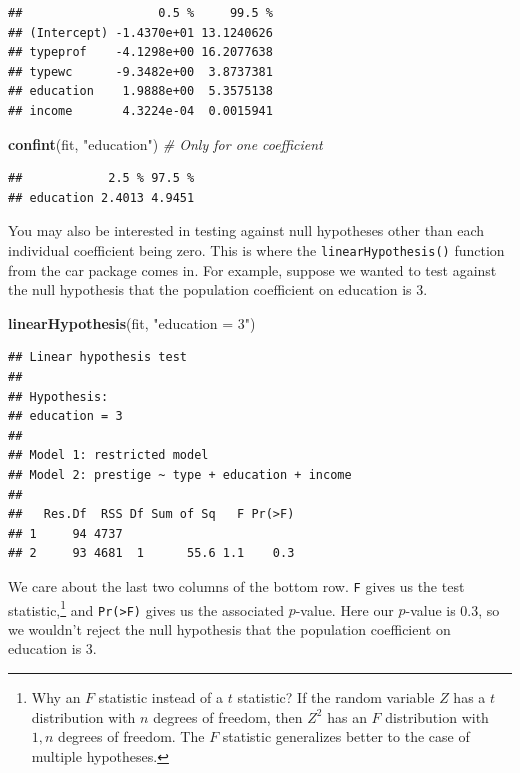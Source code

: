 \documentclass[12pt,oneside,openany]{book}
\newenvironment{Shaded}{\begin{snugshade}}{\end{snugshade}}
\newcommand{\KeywordTok}[1]{\textcolor[rgb]{0.13,0.29,0.53}{\textbf{#1}}}
\newcommand{\StringTok}[1]{\textcolor[rgb]{0.31,0.60,0.02}{#1}}
\newcommand{\CommentTok}[1]{\textcolor[rgb]{0.56,0.35,0.01}{\textit{#1}}}
\newcommand{\NormalTok}[1]{#1}
\let\rmarkdownfootnote\footnote%
\def\footnote{\protect\rmarkdownfootnote}
\begin{document}
\begin{verbatim}
##                   0.5 %     99.5 %
## (Intercept) -1.4370e+01 13.1240626
## typeprof    -4.1298e+00 16.2077638
## typewc      -9.3482e+00  3.8737381
## education    1.9888e+00  5.3575138
## income       4.3224e-04  0.0015941
\end{verbatim}

\begin{Shaded}
\begin{Highlighting}[]
\KeywordTok{confint}\NormalTok{(fit, }\StringTok{"education"}\NormalTok{)   }\CommentTok{# Only for one coefficient}
\end{Highlighting}
\end{Shaded}

\begin{verbatim}
##            2.5 % 97.5 %
## education 2.4013 4.9451
\end{verbatim}

You may also be interested in testing against null hypotheses other than
each individual coefficient being zero. This is where the
\texttt{linearHypothesis()} function from the car package comes in. For
example, suppose we wanted to test against the null hypothesis that the
population coefficient on education is 3.

\begin{Shaded}
\begin{Highlighting}[]
\KeywordTok{linearHypothesis}\NormalTok{(fit, }\StringTok{"education = 3"}\NormalTok{)}
\end{Highlighting}
\end{Shaded}

\begin{verbatim}
## Linear hypothesis test
## 
## Hypothesis:
## education = 3
## 
## Model 1: restricted model
## Model 2: prestige ~ type + education + income
## 
##   Res.Df  RSS Df Sum of Sq   F Pr(>F)
## 1     94 4737                        
## 2     93 4681  1      55.6 1.1    0.3
\end{verbatim}

We care about the last two columns of the bottom row. \texttt{F} gives
us the test statistic,\footnote{Why an \(F\) statistic instead of a
  \(t\) statistic? If the random variable \(Z\) has a \(t\) distribution
  with \(n\) degrees of freedom, then \(Z^2\) has an \(F\) distribution
  with \(1,n\) degrees of freedom. The \(F\) statistic generalizes
  better to the case of multiple hypotheses.} and
\texttt{Pr(\textgreater{}F)} gives us the associated \(p\)-value. Here
our \(p\)-value is 0.3, so we wouldn't reject the null hypothesis that
the population coefficient on education is 3.
\end{document}

